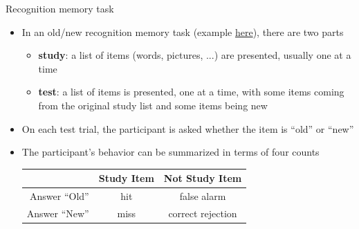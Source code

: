 \documentclass[10pt]{beamer}
\begin{document}
\begin{frame}[fragile]{Recognition memory task}
	\begin{itemize}
		\item In an old/new recognition memory task (example \href{https://youtu.be/57fp4Cjtmq0}{here}), there are two parts
		      \begin{itemize}
			      \item \textbf{study}: a list of items (words, pictures, ...) are presented, usually one at a time
			      \item \textbf{test}: a list of items is presented, one at a time, with some items coming from the original study list and some items being new
		      \end{itemize}
		\item On each test trial, the participant is asked whether the item is ``old'' or ``new''
		\item The participant's behavior can be summarized in terms of four counts
		      \vspace{0.5em}
		      \begin{center}
			      \begin{tabular}{rcc}
				      \toprule
				                     & Study Item & Not Study Item    \\
				      \hline
				      Answer ``Old'' & hit        & false alarm       \\
				      Answer ``New'' & miss       & correct rejection \\
				      \bottomrule
			      \end{tabular}
		      \end{center}
		      \vspace{0.5em}
	\end{itemize}
\end{frame}
\end{document}
